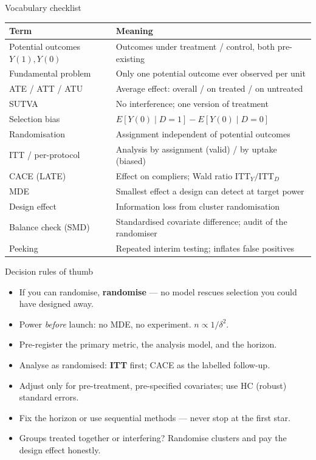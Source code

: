 \documentclass[aspectratio=169,11pt]{beamer}
\begin{document}
\begin{frame}{Vocabulary checklist}
  \footnotesize
  \begin{tabular}{ll}
    \toprule
    \textbf{Term} & \textbf{Meaning} \\
    \midrule
    Potential outcomes $Y(1),Y(0)$ & Outcomes under treatment / control, both pre-existing \\
    Fundamental problem & Only one potential outcome ever observed per unit \\
    ATE / ATT / ATU & Average effect: overall / on treated / on untreated \\
    SUTVA & No interference; one version of treatment \\
    Selection bias & $E[Y(0)\mid D{=}1] - E[Y(0)\mid D{=}0]$ \\
    Randomisation & Assignment independent of potential outcomes \\
    ITT / per-protocol & Analysis by assignment (valid) / by uptake (biased) \\
    CACE (LATE) & Effect on compliers; Wald ratio $\mathrm{ITT}_Y/\mathrm{ITT}_D$ \\
    MDE & Smallest effect a design can detect at target power \\
    Design effect & Information loss from cluster randomisation \\
    Balance check (SMD) & Standardised covariate difference; audit of the randomiser \\
    Peeking & Repeated interim testing; inflates false positives \\
    \bottomrule
  \end{tabular}
\end{frame}

\begin{frame}{Decision rules of thumb}
  \begin{itemize}
    \item If you can randomise, \textbf{randomise} --- no model rescues selection you
          could have designed away.
    \item Power \emph{before} launch: no MDE, no experiment. $n \propto 1/\delta^2$.
    \item Pre-register the primary metric, the analysis model, and the horizon.
    \item Analyse as randomised: \textbf{ITT} first; CACE as the labelled follow-up.
    \item Adjust only for pre-treatment, pre-specified covariates; use HC (robust)
          standard errors.
    \item Fix the horizon or use sequential methods --- never stop at the first star.
    \item Groups treated together or interfering? Randomise clusters and pay the
          design effect honestly.
  \end{itemize}
\end{frame}
\end{document}
